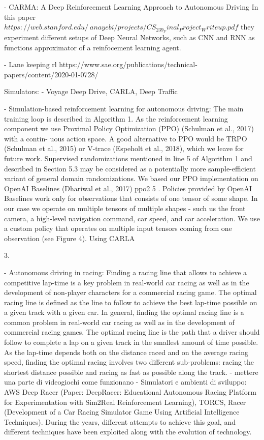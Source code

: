 - CARMA: A Deep Reinforcement Learning Approach to Autonomous Driving
In this paper $https://web.stanford.edu/~anayebi/projects/CS_239_Final_Project_Writeup.pdf$ they experiment different setups of Deep Neural Networks, such as CNN and RNN as functions approximator of a reinfocement learning agent.


- Lane keeping rl https://www.sae.org/publications/technical-papers/content/2020-01-0728/


Simulators:
- Voyage Deep Drive, CARLA, Deep Traffic

- Simulation-based reinforcement learning for autonomous driving:
The main training loop is described in Algorithm 1. As the reinforcement learning component we use Proximal Policy Optimization (PPO) (Schulman et al., 2017) with a contin-
uous action space. A good alternative to PPO would be TRPO (Schulman et al., 2015) or V-trace (Espeholt et al., 2018), which we leave for future work. Supervised randomizations mentioned in line 5 of Algorithm 1 and described in Section 5.3 may be considered as a potentially more sample-efficient variant of general domain randomizations. We based our PPO implementation on OpenAI Baselines (Dhariwal et al., 2017) ppo2 5 . Policies provided by OpenAI Baselines work only for observations that consists of one tensor of some shape. In our case we operate on multiple tensors of multiple shapes - such us the front camera,
a high-level navigation command, car speed, and car acceleration. We use a custom policy that operates on multiple input tensors coming from one observation (see Figure 4).	
	Using CARLA

	
3.

- Autonomous driving in racing:
Finding a racing line that allows to achieve a competitive lap-time is a key problem in real-world car racing as well as in the development of non-player characters for a commercial racing game.
The optimal racing line is defined as the line to follow to achieve the best lap-time possible on a given track with a given car. In general, finding the optimal racing line is
a common problem in real-world car racing as well as in the development of commercial racing games. The optimal racing line is the path that a driver should follow to complete a lap on a given track in the smallest amount of time possible. As the lap-time depends both on the distance raced and on the average racing speed, finding the optimal racing involves two different sub-problems: racing the shortest distance possible and racing as fast
as possible along the track.
- mettere una parte di videogiochi come funzionano
- Simulatori e ambienti di sviluppo:
AWS Deep Racer (Paper: DeepRacer: Educational Autonomous Racing Platform for Experimentation with Sim2Real Reinforcement Learning), TORCS, Racer (Development of a Car Racing Simulator Game Using Artificial Intelligence Techniques).
During the years, different attempts to achieve this goal, and different techniques have been exploited along with the evolution of technology.

